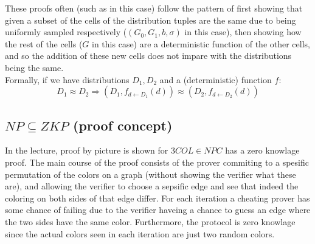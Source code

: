 These proofs often (such as in this case) follow the pattern of
first showing that given a subset of the cells of the distribution tuples
are the same due to being uniformly sampled respectively ($(G_0,G_1,b,\sigma)$ in this case),
then showing how the rest of the cells ($G$ in this case)
are a deterministic function of the other cells,
and so the addition of these new cells does not impare with the 
distributions being the same.\\
Formally, if we have distributions $D_1, D_2$ and a (deterministic) function $f$:
\[
	D_1\approx D_2
	\Rightarrow
	(D_1, f_{d\leftarrow D_1}(d))\approx (D_2, f_{d\leftarrow D_2}(d))
\]

\subsection*{$NP\subseteq ZKP$ (proof concept)}
In the lecture, proof by picture is shown for $3COL\in NPC$
has a zero knowlage proof. The main course of the proof consists of
the prover commiting to a spesific permutation of the colors on
a graph (without showing the verifier what these are), and allowing
the verifier to choose a sepsific edge and see that indeed
the coloring on both sides of that edge differ.
For each iteration a cheating prover has some chance of failing due
to the verifier haveing a chance to guess an edge where the two sides
have the same color. Furthermore, the protocol is zero knowlage
since the actual colors seen in each iteration are just two random colors.